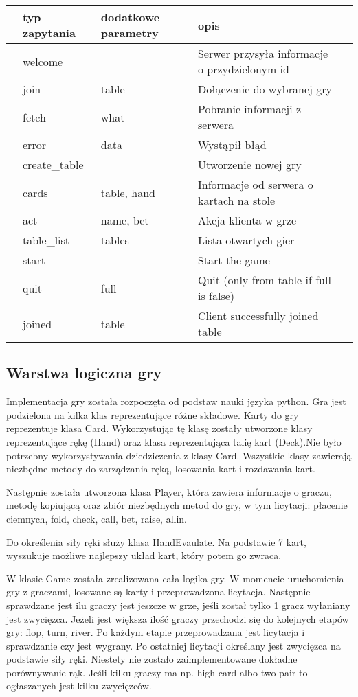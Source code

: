 \documentclass[12pt,a4paper]{article}
\begin{document}
\begin{table}[h]
\begin{tabular}{lllll}
\hline
 & typ zapytania & dodatkowe parametry & opis &  \\ \hline
 & welcome &  & Serwer przysyła informacje o przydzielonym id &  \\
 & join & table & Dołączenie do wybranej gry &  \\
 & fetch & what & Pobranie informacji z serwera &  \\
 & error & data & Wystąpił błąd &  \\
 & create\_table &  & Utworzenie nowej gry &  \\ 
 & cards & table, hand & Informacje od serwera o kartach na stole &  \\ 
 & act & name, bet & Akcja klienta w grze &  \\ 
 & table\_list & tables & Lista otwartych gier &  \\ 
 & start &  & Start the game &  \\ 
 & quit & full & Quit (only from table if full is false) &  \\ 
 & joined & table & Client successfully joined table &  \\ 
 \hline
\end{tabular}
\end{table}

\subsection{Warstwa logiczna gry}

Implementacja gry została rozpoczęta od podstaw nauki języka python. Gra jest podzielona na
kilka klas reprezentujące różne składowe. Karty do gry reprezentuje klasa Card.
Wykorzystując tę klasę zostały utworzone klasy reprezentujące rękę (Hand) oraz klasa
reprezentująca talię kart (Deck).Nie było potrzebny wykorzystywania dziedziczenia z klasy
Card. Wszystkie klasy zawierają niezbędne metody do zarządzania ręką, losowania kart i
rozdawania kart.

Następnie została utworzona klasa Player, która zawiera informacje o graczu, metodę
kopiującą oraz zbiór niezbędnych metod do gry, w tym licytacji: płacenie ciemnych, fold,
check, call, bet, raise, allin.

Do określenia siły ręki służy klasa HandEvaulate. Na podstawie 7 kart, wyszukuje możliwe
najlepszy układ kart, który potem go zwraca.

W klasie Game została zrealizowana cała logika gry. W momencie uruchomienia gry z
graczami, losowane są karty i przeprowadzona licytacja. Następnie sprawdzane jest ilu graczy
jest jeszcze w grze, jeśli został tylko 1 gracz wyłaniany jest zwycięzca. Jeżeli jest większa
ilość graczy przechodzi się do kolejnych etapów gry: flop, turn, river. Po każdym etapie
przeprowadzana jest licytacja i sprawdzanie czy jest wygrany. Po ostatniej licytacji określany
jest zwycięzca na podstawie siły ręki. Niestety nie zostało zaimplementowane dokładne
porównywanie rąk. Jeśli kilku graczy ma np. high card albo two pair to ogłaszanych jest kilku
zwycięzców.
\end{document}
